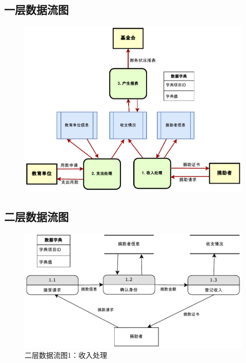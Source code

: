 \documentclass[12pt, a4paper, oneside]{ctexart}
\begin{document}
\subsection{一层数据流图}

\begin{figure}[H]
    \centering
    \includegraphics[width = 1\textwidth]{../pic/一级.pdf}
\end{figure}

\subsection{二层数据流图}

\begin{figure}[H]
    \centering
    \includegraphics[width = 1\textwidth]{../pic/二级1.pdf}
    \caption{二层数据流图1：收入处理}
\end{figure}
\end{document}
